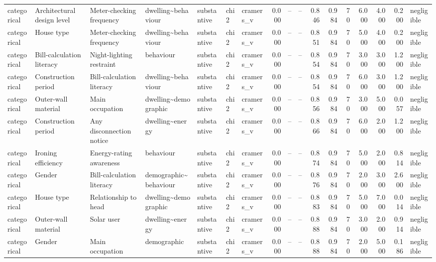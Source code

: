 \begin{table}
\begin{tabular}{lllllllrrrrrrrrrl}
categorical & Architectural design level & Meter-checking frequency & dwelling\textasciitilde behaviour & substantive & chi2 & cramers\_v & 0.000 & -- & -- & 0.846 & 0.984 & 70 & 6.000 & 4.000 & 0.200 & negligible \\
categorical & House type & Meter-checking frequency & dwelling\textasciitilde behaviour & substantive & chi2 & cramers\_v & 0.000 & -- & -- & 0.851 & 0.984 & 70 & 5.000 & 4.000 & 0.200 & negligible \\
categorical & Bill-calculation literacy & Night-lighting restraint & behaviour & substantive & chi2 & cramers\_v & 0.000 & -- & -- & 0.854 & 0.984 & 70 & 3.000 & 3.000 & 1.200 & negligible \\
categorical & Construction period & Bill-calculation literacy & dwelling\textasciitilde behaviour & substantive & chi2 & cramers\_v & 0.000 & -- & -- & 0.854 & 0.984 & 70 & 6.000 & 3.000 & 1.200 & negligible \\
categorical & Outer-wall material & Main occupation & dwelling\textasciitilde demographic & substantive & chi2 & cramers\_v & 0.000 & -- & -- & 0.856 & 0.984 & 70 & 3.000 & 5.000 & 0.057 & negligible \\
categorical & Construction period & Any disconnection notice & dwelling\textasciitilde energy & substantive & chi2 & cramers\_v & 0.000 & -- & -- & 0.866 & 0.984 & 70 & 6.000 & 2.000 & 1.200 & negligible \\
categorical & Ironing efficiency & Energy-rating awareness & behaviour & substantive & chi2 & cramers\_v & 0.000 & -- & -- & 0.874 & 0.984 & 70 & 5.000 & 2.000 & 0.814 & negligible \\
categorical & Gender & Bill-calculation literacy & demographic\textasciitilde behaviour & substantive & chi2 & cramers\_v & 0.000 & -- & -- & 0.876 & 0.984 & 70 & 2.000 & 3.000 & 2.600 & negligible \\
categorical & House type & Relationship to head & dwelling\textasciitilde demographic & substantive & chi2 & cramers\_v & 0.000 & -- & -- & 0.883 & 0.984 & 70 & 5.000 & 7.000 & 0.014 & negligible \\
categorical & Outer-wall material & Solar user & dwelling\textasciitilde energy & substantive & chi2 & cramers\_v & 0.000 & -- & -- & 0.888 & 0.984 & 70 & 3.000 & 2.000 & 0.914 & negligible \\
categorical & Gender & Main occupation & demographic & substantive & chi2 & cramers\_v & 0.000 & -- & -- & 0.888 & 0.984 & 70 & 2.000 & 5.000 & 0.186 & negligible \\

\end{tabular}
\end{table}

